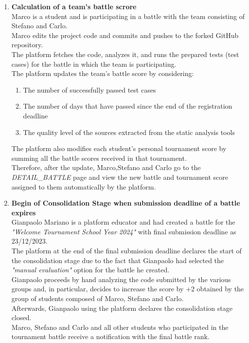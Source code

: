 \begin{enumerate}
\item \textbf{Calculation of a team's battle scrore}\\
Marco is a student and is participating in a battle with the team consisting of Stefano and Carlo.\\
Marco edits the project code and commits and pushes to the forked GitHub repository. \\
The platform fetches the code, analyzes it, and runs the prepared tests (test cases) for the battle in which the team is participating.\\
The platform updates the team's battle score by considering:
				\begin{enumerate}
					\item The number of successfully passed test cases
					\item The number of days that have passed since the end of the registration deadline
					\item The quality level of the sources extracted from the static analysis tools 
				\end{enumerate}
The platform also modifies each student's personal tournament score by summing all the battle scores received in that tournament.\\
Therefore, after the update, Marco,Stefano and Carlo go to the \emph{DETAIL\_BATTLE} page and view the new battle and tournament score assigned to them automatically by the platform.\\

    	



\item \textbf{Begin of Consolidation Stage when submission deadline of a battle expires}\\
Gianpaolo Mariano is a platform educator and had created a battle for the \emph{"Welcome Tournament School Year 2024"} with final submission deadline as 23/12/2023.\\
The platform at the end of the final submission deadline declares the start of the consolidation stage due to the fact that Gianpaolo had selected the \emph{"manual evaluation"} option for the battle he created.\\
Gianpaolo proceeds by hand analyzing the code submitted by the various groups and, in particular, decides to increase the score by +2 obtained by the group of students composed of Marco, Stefano and Carlo.\\
Afterwards, Gianpaolo using the platform declares the consolidation stage closed.\\
Marco, Stefano and Carlo and all other students who participated in the tournament battle receive a notification with the final battle rank.



\end{enumerate}
